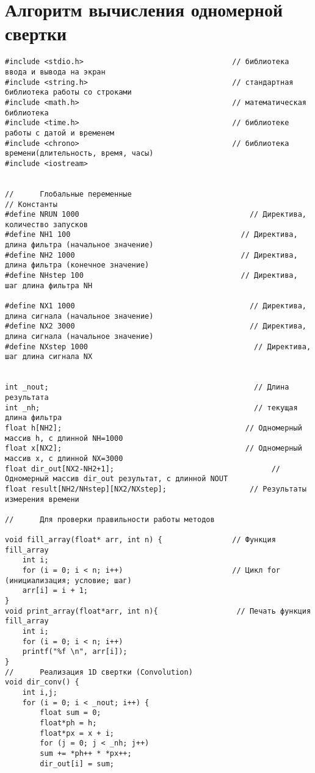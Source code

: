 \chapter{Алгоритм вычисления одномерной свертки}\label{app:Ё}
\begin{verbatim}
#include <stdio.h>                                  // библиотека ввода и вывода на экран
#include <string.h>                                 // стандартная библиотека работы со строками
#include <math.h>                                   // математическая библиотека
#include <time.h>                                   // библиотеке работы с датой и временем
#include <chrono>                                   // библиотека времени(длительность, время, часы)
#include <iostream>


//      Глобальные переменные
// Константы
#define NRUN 1000                                       // Директива, количество запусков
#define NH1 100                                       // Директива, длина фильтра (начальное значение)
#define NH2 1000                                      // Директива, длина фильтра (конечное значение)
#define NHstep 100                                    // Директива,  шаг длина фильтра NH

#define NX1 1000                                        // Директива, длина сигнала (начальное значение)
#define NX2 3000                                        // Директива, длина сигнала (начальное значение)
#define NXstep 1000                                      // Директива,  шаг длина сигнала NX


int _nout;                                               // Длина результата
int _nh;                                                 // текущая длина фильтра
float h[NH2];                                          // Одномерный массив h, с длинной NH=1000
float x[NX2];                                          // Одномерный массив x, с длинной NX=3000
float dir_out[NX2-NH2+1];                                    // Одномерный массив dir_out результат, с длинной NOUT
float result[NH2/NHstep][NX2/NXstep];                   // Результаты измерения времени

//      Для проверки правильности работы методов

void fill_array(float* arr, int n) {                // Функция fill_array
	int i;
	for (i = 0; i < n; i++)                         // Цикл for (инициализация; условие; шаг)
	arr[i] = i + 1;
}
void print_array(float*arr, int n){                  // Печать функция fill_array
	int i;
	for (i = 0; i < n; i++)
	printf("%f \n", arr[i]);
}
//      Реализация 1D свертки (Convolution)
void dir_conv() {
	int i,j;
	for (i = 0; i < _nout; i++) {
		float sum = 0;
		float*ph = h;
		float*px = x + i;
		for (j = 0; j < _nh; j++)
		sum += *ph++ * *px++;
		dir_out[i] = sum;
		

\end{verbatim}
